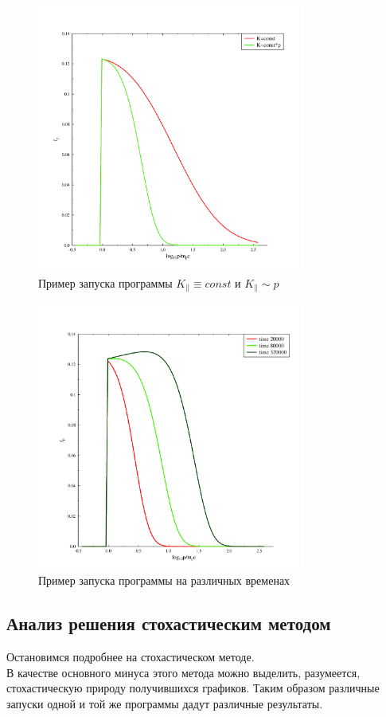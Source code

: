 \documentclass[a4paper,14pt]{extarticle} %
\begin{document}
\begin{figure}[!htb]
\centering
\includegraphics[width=250pt]{r_bom_or_not}
\caption{Пример запуска программы $K_\parallel\equiv const$ и $K_\parallel \sim p $}
\label{res/razn/bom}
\end{figure}

\begin{figure}[!htb]
\centering
\includegraphics[width=250pt]{r_times}
\caption{Пример запуска программы на различных временах}
\label{res/razn/bom}
\end{figure}
\subsection{Анализ решения стохастическим методом}
Остановимся подробнее на стохастическом методе.\\
В качестве основного минуса этого метода можно выделить, разумеется, стохастическую природу получившихся графиков. Таким образом различные запуски одной и той же программы дадут различные результаты.
\end{document}
